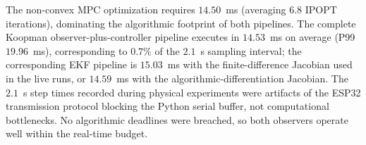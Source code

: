 \documentclass[asi,article,accept,pdftex,moreauthors]{Definitions/mdpi}
\let\oldtextcolor\textcolor
\renewcommand{\textcolor}[2]{\ifx\relax#1\relax#2\else\oldtextcolor{#1}{#2}\fi}%
\begin{document}
{The non-convex MPC optimization requires $14.50$~ms (averaging $6.8$ IPOPT iterations), dominating the algorithmic footprint of both pipelines. The complete Koopman observer-plus-controller pipeline executes in $14.53$~ms on average (P99 $19.96$~ms), corresponding to $0.7\%$ of the $2.1$~s sampling interval; the corresponding EKF pipeline is $15.03$~ms with the finite-difference Jacobian used in the live runs, or $14.59$~ms with the algorithmic-differentiation Jacobian. The $2.1$~s step times recorded during physical experiments were artifacts of the ESP32 transmission protocol blocking the Python serial buffer, not computational bottlenecks. No algorithmic deadlines were breached, so both observers operate well within the real-time budget.}

\begin{table}[H]
  \caption{{Isolated algorithmic execution profiling (AMD Ryzen~7 7735HS, Windows~11, Python~3.10.11, CasADi~3.7.2).}}
  \label{tab:timing}
  
\end{table}

\end{document}
